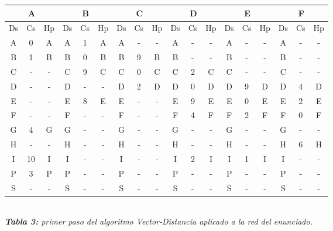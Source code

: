 \documentclass[letterpaper,10pt,onecolumn,titlepage]{article}
\begin{document}
\begin{center}
   \begin{tabular}{|c|c|c|c|c|c|c|c|c|c|c|c|c|c|c|c|c|c|} \hline
    \multicolumn{3}{|c|}{A} & \multicolumn{3}{|c|}{B} & \multicolumn{3}{|c|}{C} & \multicolumn{3}{|c|}{D} & \multicolumn{3}{|c|}{E} & \multicolumn{3}{|c|}{F} \\ \hline
     Ds & Cs & Hp & Ds & Cs & Hp & Ds & Cs & Hp & Ds & Cs & Hp & Ds & Cs & Hp & Ds & Cs & Hp \\ \hline
     A  & 0  & A  & A  & 1  & A  & A  & -  & -  & A  & -  & -  & A  & -  & -  & A  & -  & - \\ \hline
     B  & 1  & B  & B  & 0  & B  & B  & 9  & B  & B  & -  & -  & B  & -  & - & B  & -  & - \\ \hline
     C  & -  & -  & C  & 9  & C  & C  & 0  & C  & C  & 2  & C  & C  & -  & -  & C  & -  & - \\ \hline
     D  & -  & -  & D  & -  & - & D  & 2  & D  & D  & 0  & D  & D  & 9  & D  & D  & 4  & D \\ \hline
     E  & -  & -  & E  & 8  & E  & E  & -  & -  & E  & 9  & E  & E  & 0  & E  & E  & 2  & E \\ \hline
     F  & -  & -  & F  & -  & -  & F  & -  & -  & F  & 4  & F  & F  & 2  & F  & F  & 0  & F \\ \hline
     G  & 4  & G  & G  & -  & -  & G  & -  & -  & G  & -  & -  & G  & -  & -  & G  & -  & - \\ \hline
     H  & -  & -  & H  & -  & -  & H  & -  & -  & H  & -  & -  & H  & -  & -  & H  & 6  & H \\ \hline
     I  & 10  & I  & I  & -  & -  & I  & -  & -  & I  & 2  & I  & I  & 1  & I  & I  & -  & - \\ \hline
     P  & 3  & P  & P  & -  & -  & P  & -  & -  & P  & -  & -  & P  & -  & -  & P  & -  & - \\ \hline
     S  & -  & -  & S  & -  & -  & S  & -  & -  & S  & -  & -  & S  & -  & -  & S  & -  & - \\ \hline
   \end{tabular}\\
   \textit{\textbf{Tabla 3:} primer paso del algoritmo Vector-Distancia aplicado a la red del enunciado.}
 \end{center}
 
\end{document}
